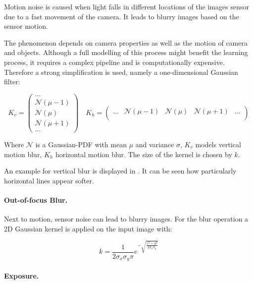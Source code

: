 Motion noise is caused when light falls in different locations of the images sensor due to a fast movement of the camera. It leads to blurry images based on the sensor motion.

The phenomenon depends on camera properties as well as the motion of camera and objects. Although a full modelling of this process might benefit the learning process, it requires a complex pipeline and is computationally expensive. Therefore a strong simplification is used, namely a one-dimensional Gaussian filter:

\begin{equation}
K_v = \begin{pmatrix}
...				 \\
\mathcal{N}(\mu-1) \\
\mathcal{N}(\mu)  \\
\mathcal{N}(\mu+1)	 \\
	...					
\end{pmatrix} \quad
K_h = \begin{pmatrix}
...	& \mathcal{N}(\mu-1)	&	\mathcal{N}(\mu) &	\mathcal{N}(\mu+1) & ...\\
\end{pmatrix}
	\label{eq:motion_noise}
\end{equation}

Where $\mathcal{N}$ is a Gaussian-PDF with mean $\mu$ and variance $\sigma$,  $K_v$ models vertical motion blur, $K_h$ horizontal motion blur. The size of the kernel is chosen by $k$.

An example for vertical blur is displayed in . It can be seen how particularly horizontal lines appear softer.

\paragraph{Out-of-focus Blur.}

Next to motion, sensor noise can lead to blurry images. For the blur operation a 2D Gaussian kernel is applied on the input image with:

\begin{equation}
 k = \frac{1}{2\sigma_x\sigma_y\pi}e^{-\sqrt{\frac{x^2 + y^2}{2\sigma_x\sigma_y}}} 
\end{equation}

\paragraph{Exposure.}

